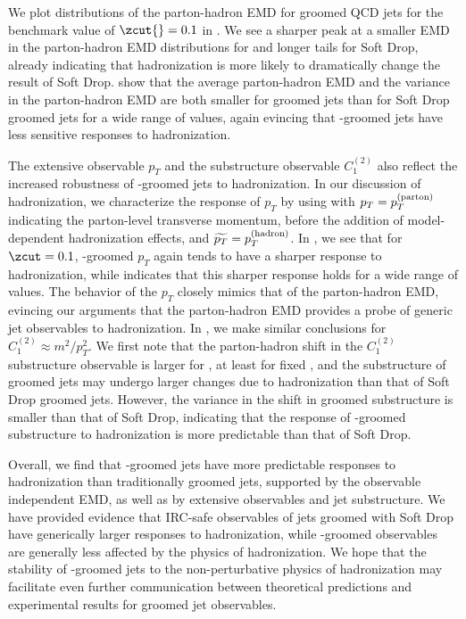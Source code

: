 We plot distributions of the parton-hadron EMD for groomed QCD jets for the benchmark value of $\zcut{}=0.1$ in .
%
We see a sharper peak at a smaller EMD in the parton-hadron EMD distributions for  and longer tails for Soft Drop, already indicating that hadronization is more likely to dramatically change the result of Soft Drop.
%
 show that the average parton-hadron EMD and the variance in the parton-hadron EMD are both smaller for  groomed jets than for Soft Drop groomed jets for a wide range of \zcut{} values, again evincing that \PIRANHA{}-groomed jets have less sensitive responses to hadronization.

The extensive observable \(p_T\) and the substructure observable \(C_1^{(2)}\) also reflect the increased robustness of \PIRANHA{}-groomed jets to hadronization.
%
In our discussion of hadronization, we characterize the response of \(p_T\) by using  with \(p_T = p_T^{\rm(parton)}\) indicating the parton-level transverse momentum, before the addition of model-dependent hadronization effects, and \(\widetilde{p_T} = p_T^{\rm(hadron)}\).
%
In , we see that for \(\zcut = 0.1\), \PIRANHA{}-groomed \(p_T\) again tends to have a sharper response to hadronization, while  indicates that this sharper response holds for a wide range of \zcut{} values.
%
The behavior of the \(p_T\) closely mimics that of the parton-hadron EMD, evincing our arguments that the parton-hadron EMD provides a probe of generic jet observables to hadronization.
%
In , we make similar conclusions for \(C_1^{(2)} \approx m^2 / p_T^2\).
%
We first note that the parton-hadron shift in the \(C_1^{(2)}\) substructure observable is larger for , at least for fixed \zcut{}, and the substructure of  groomed jets may undergo larger changes due to hadronization than that of Soft Drop groomed jets.
%
However, the variance in the shift in  groomed substructure is smaller than that of Soft Drop, indicating that the response of \PIRANHA{}-groomed substructure to hadronization is more predictable than that of Soft Drop.

Overall, we find that \PIRANHA{}-groomed jets have more predictable responses to hadronization than traditionally groomed jets, supported by the observable independent EMD, as well as by extensive observables and jet substructure.
%
We have provided evidence that IRC-safe observables of jets groomed with Soft Drop have generically larger responses to hadronization, while \PIRANHA{}-groomed observables are generally less affected by the physics of hadronization.
%
We hope that the stability of \PIRANHA{}-groomed jets to the non-perturbative physics of hadronization may facilitate even further communication between theoretical predictions and experimental results for groomed jet observables.

